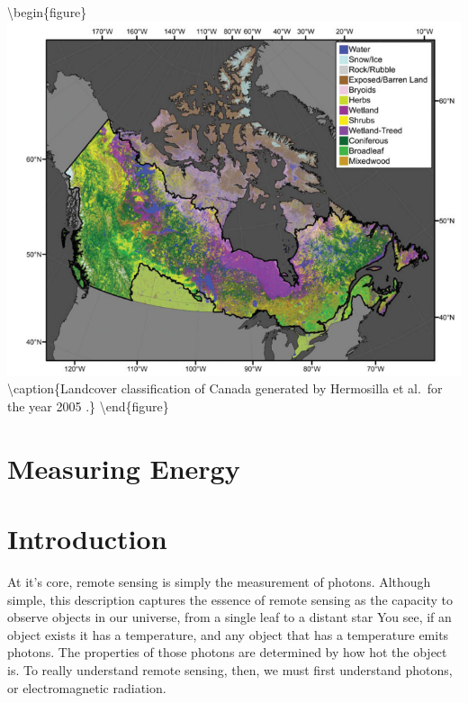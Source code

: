 \documentclass[
]{book}
\begin{document}
\textbackslash begin\{figure\}
\includegraphics[width=10.64in]{images/11-hermosilla-canada-landcover} \textbackslash caption\{Landcover classification of Canada generated by Hermosilla et al.~for the year 2005 \citep{hermosilla_disturbance-informed_2018}.\}\label{fig:11-hermosilla-canada-landcover}
\textbackslash end\{figure\}

\hypertarget{measuring-energy}{%
\section{Measuring Energy}\label{measuring-energy}}

\hypertarget{introduction-1}{%
\section{Introduction}\label{introduction-1}}

At it's core, remote sensing is simply the measurement of photons.
Although simple, this description captures the essence of remote
sensing as the capacity to observe objects in our universe, from a single
leaf to a distant star You see, if an object exists it has a
temperature, and any object that has a temperature emits photons. The
properties of those photons are determined by how hot the object is. To
really understand remote sensing, then, we must first understand
photons, or electromagnetic radiation.
\end{document}
